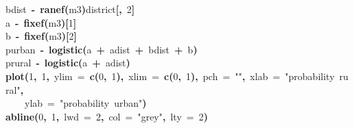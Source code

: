 \documentclass{article}
\makeatletter
\newcommand{\hlnumber}[1]{\textcolor[rgb]{0,0,0}{#1}}%
\newcommand{\hlfunctioncall}[1]{\textcolor[rgb]{.5,0,.33}{\textbf{#1}}}%
\newcommand{\hlstring}[1]{\textcolor[rgb]{.6,.6,1}{#1}}%
\newcommand{\hlkeyword}[1]{\textbf{#1}}%
\newcommand{\hlargument}[1]{\textcolor[rgb]{.69,.25,.02}{#1}}%
\newcommand{\hlassignement}[1]{\textbf{#1}}%
\newcommand{\hlsymbol}[1]{#1}%
\newcommand{\hlstd}[1]{\textcolor[rgb]{0,0,0}{#1}}%
\newenvironment{kframe}{%
 \def\FrameCommand##1{\hskip\@totalleftmargin \hskip-\fboxsep
 \colorbox{shadecolor}{##1}\hskip-\fboxsep
     \hskip-\linewidth \hskip-\@totalleftmargin \hskip\columnwidth}%
 \MakeFramed {\advance\hsize-\width
   \@totalleftmargin\z@ \linewidth\hsize
   \@setminipage}}%
 {\par\unskip\endMakeFramed}
\newenvironment{knitrout}{}{} %
\makeatother
\begin{document}
\begin{knitrout}
{\begin{kframe}
\begin{flushleft}
\hlstd{}\hlsymbol{b\usebox{\hlnormalsizeboxunderscore}dist}{\ }\hlassignement{\usebox{\hlnormalsizeboxlessthan}-}{\ }\hlfunctioncall{ranef}\hlkeyword{(}\hlsymbol{m3}\hlkeyword{)}\hlkeyword{\usebox{\hlnormalsizeboxdollar}}\hlsymbol{district}\hlkeyword{[}\hlkeyword{,}{\ }\hlnumber{2}\hlkeyword{]}\hspace*{\fill}\\
\hlstd{}\hlsymbol{a}{\ }\hlassignement{\usebox{\hlnormalsizeboxlessthan}-}{\ }\hlfunctioncall{fixef}\hlkeyword{(}\hlsymbol{m3}\hlkeyword{)}\hlkeyword{[}\hlnumber{1}\hlkeyword{]}\hspace*{\fill}\\
\hlstd{}\hlsymbol{b}{\ }\hlassignement{\usebox{\hlnormalsizeboxlessthan}-}{\ }\hlfunctioncall{fixef}\hlkeyword{(}\hlsymbol{m3}\hlkeyword{)}\hlkeyword{[}\hlnumber{2}\hlkeyword{]}\hspace*{\fill}\\
\hlstd{}\hlsymbol{p\usebox{\hlnormalsizeboxunderscore}urban}{\ }\hlassignement{\usebox{\hlnormalsizeboxlessthan}-}{\ }\hlfunctioncall{logistic}\hlkeyword{(}\hlsymbol{a}{\ }\hlkeyword{+}{\ }\hlsymbol{a\usebox{\hlnormalsizeboxunderscore}dist}{\ }\hlkeyword{+}{\ }\hlsymbol{b\usebox{\hlnormalsizeboxunderscore}dist}{\ }\hlkeyword{+}{\ }\hlsymbol{b}\hlkeyword{)}\hspace*{\fill}\\
\hlstd{}\hlsymbol{p\usebox{\hlnormalsizeboxunderscore}rural}{\ }\hlassignement{\usebox{\hlnormalsizeboxlessthan}-}{\ }\hlfunctioncall{logistic}\hlkeyword{(}\hlsymbol{a}{\ }\hlkeyword{+}{\ }\hlsymbol{a\usebox{\hlnormalsizeboxunderscore}dist}\hlkeyword{)}\hspace*{\fill}\\
\hlstd{}\hlfunctioncall{plot}\hlkeyword{(}\hlnumber{1}\hlkeyword{,}{\ }\hlnumber{1}\hlkeyword{,}{\ }\hlargument{ylim}{\ }\hlargument{=}{\ }\hlfunctioncall{c}\hlkeyword{(}\hlnumber{0}\hlkeyword{,}{\ }\hlnumber{1}\hlkeyword{)}\hlkeyword{,}{\ }\hlargument{xlim}{\ }\hlargument{=}{\ }\hlfunctioncall{c}\hlkeyword{(}\hlnumber{0}\hlkeyword{,}{\ }\hlnumber{1}\hlkeyword{)}\hlkeyword{,}{\ }\hlargument{pch}{\ }\hlargument{=}{\ }\hlstring{""}\hlkeyword{,}{\ }\hlargument{xlab}{\ }\hlargument{=}{\ }\hlstring{"probability{\ }rural"}\hlkeyword{,}\hspace*{\fill}\\
\hlstd{}{\ }{\ }{\ }{\ }\hlargument{ylab}{\ }\hlargument{=}{\ }\hlstring{"probability{\ }urban"}\hlkeyword{)}\hspace*{\fill}\\
\hlstd{}\hlfunctioncall{abline}\hlkeyword{(}\hlnumber{0}\hlkeyword{,}{\ }\hlnumber{1}\hlkeyword{,}{\ }\hlargument{lwd}{\ }\hlargument{=}{\ }\hlnumber{2}\hlkeyword{,}{\ }\hlargument{col}{\ }\hlargument{=}{\ }\hlstring{"grey"}\hlkeyword{,}{\ }\hlargument{lty}{\ }\hlargument{=}{\ }\hlnumber{2}\hlkeyword{)}\hspace*{\fill}\\

\end{flushleft}
\end{kframe}}
\end{knitrout}
\end{document}
